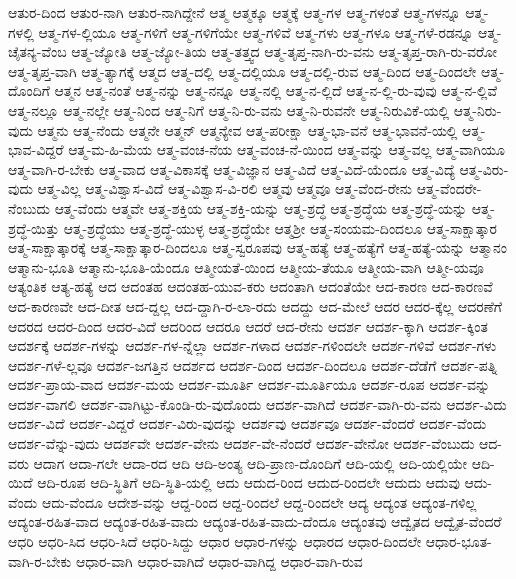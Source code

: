 {ಆತುರ-ದಿಂದ
ಆತುರ-ನಾಗಿ
ಆತುರ-ನಾಗಿದ್ದೇನೆ
ಆತ್ಮ
ಆತ್ಮಕ್ಕೂ
ಆತ್ಮಕ್ಕೆ
ಆತ್ಮ-ಗಳ
ಆತ್ಮ-ಗಳಂತೆ
ಆತ್ಮ-ಗಳನ್ನೂ
ಆತ್ಮ-ಗಳಲ್ಲಿ
ಆತ್ಮ-ಗಳ-ಲ್ಲಿಯೂ
ಆತ್ಮ-ಗಳಿಗೆ
ಆತ್ಮ-ಗಳಿಗೆಯೇ
ಆತ್ಮ-ಗಳಿವೆ
ಆತ್ಮ-ಗಳು
ಆತ್ಮ-ಗಳೂ
ಆತ್ಮ-ಗಳೆ-ರಡನ್ನೂ
ಆತ್ಮ-ಚೈತನ್ಯ-ವೆಂಬ
ಆತ್ಮ-ಜ್ಯೋತಿ
ಆತ್ಮ-ಜ್ಯೋ-ತಿಯ
ಆತ್ಮ-ತತ್ತ್ವದ
ಆತ್ಮ-ತೃಪ್ತ-ನಾಗಿ-ರು-ವನು
ಆತ್ಮ-ತೃಪ್ತ-ರಾಗಿ-ರು-ವರೋ
ಆತ್ಮ-ತೃಪ್ತ-ವಾಗಿ
ಆತ್ಮ-ತ್ಯಾಗಕ್ಕೆ
ಆತ್ಮದ
ಆತ್ಮ-ದಲ್ಲಿ
ಆತ್ಮ-ದಲ್ಲಿಯೂ
ಆತ್ಮ-ದಲ್ಲಿ-ರುವ
ಆತ್ಮ-ದಿಂದ
ಆತ್ಮ-ದಿಂದಲೇ
ಆತ್ಮ-ದೊಂದಿಗೆ
ಆತ್ಮನ
ಆತ್ಮ-ನಂತೆ
ಆತ್ಮ-ನನ್ನು
ಆತ್ಮ-ನನ್ನೂ
ಆತ್ಮ-ನಲ್ಲಿ
ಆತ್ಮ-ನ-ಲ್ಲಿದೆ
ಆತ್ಮ-ನ-ಲ್ಲಿ-ರು-ವುವು
ಆತ್ಮ-ನ-ಲ್ಲಿವೆ
ಆತ್ಮ-ನಲ್ಲೂ
ಆತ್ಮ-ನಲ್ಲೇ
ಆತ್ಮ-ನಿಂದ
ಆತ್ಮ-ನಿಗೆ
ಆತ್ಮ-ನಿ-ರು-ವನು
ಆತ್ಮ-ನಿ-ರುವನೇ
ಆತ್ಮ-ನಿರುವಿಕೆ-ಯಲ್ಲಿ
ಆತ್ಮ-ನಿರು-ವುದು
ಆತ್ಮನು
ಆತ್ಮ-ನೆಂದು
ಆತ್ಮನೇ
ಆತ್ಮನ್
ಆತ್ಮನ್ಯೇವ
ಆತ್ಮ-ಪರೀಕ್ಷಾ
ಆತ್ಮ-ಭಾ-ವನೆ
ಆತ್ಮ-ಭಾವನೆ-ಯಲ್ಲಿ
ಆತ್ಮ-ಭಾವ-ವಿದ್ದರೆ
ಆತ್ಮ-ಮ-ಹಿ-ಮೆಯ
ಆತ್ಮ-ವಂಚ-ನೆಯ
ಆತ್ಮ-ವಂಚ-ನೆ-ಯಿಂದ
ಆತ್ಮ-ವನ್ನು
ಆತ್ಮ-ವಲ್ಲ
ಆತ್ಮ-ವಾಗಿಯೂ
ಆತ್ಮ-ವಾಗಿ-ರ-ಬೇಕು
ಆತ್ಮ-ವಾದ
ಆತ್ಮ-ವಿಕಾಸಕ್ಕೆ
ಆತ್ಮ-ವಿಜ್ಞಾನ
ಆತ್ಮ-ವಿದೆ
ಆತ್ಮ-ವಿದೆ-ಯೆಂದೂ
ಆತ್ಮ-ವಿದ್ಯೆ
ಆತ್ಮ-ವಿರು-ವುದು
ಆತ್ಮ-ವಿಲ್ಲ
ಆತ್ಮ-ವಿಶ್ವಾಸ-ವಿದೆ
ಆತ್ಮ-ವಿಶ್ವಾಸ-ವಿ-ರಲಿ
ಆತ್ಮವು
ಆತ್ಮವೂ
ಆತ್ಮ-ವೆಂದ-ರೇನು
ಆತ್ಮ-ವೆಂದರೇ-ನೆಂಬುದು
ಆತ್ಮ-ವೆಂದು
ಆತ್ಮವೇ
ಆತ್ಮ-ಶಕ್ತಿಯ
ಆತ್ಮ-ಶಕ್ತಿ-ಯನ್ನು
ಆತ್ಮ-ಶ್ರದ್ಧೆ
ಆತ್ಮ-ಶ್ರದ್ಧೆಯ
ಆತ್ಮ-ಶ್ರದ್ಧೆ-ಯನ್ನು
ಆತ್ಮ-ಶ್ರದ್ಧೆ-ಯಿತ್ತು
ಆತ್ಮ-ಶ್ರದ್ಧೆಯು
ಆತ್ಮ-ಶ್ರದ್ಧೆ-ಯುಳ್ಳ
ಆತ್ಮ-ಶ್ರದ್ಧೆಯೇ
ಆತ್ಮಶ್ರೀ
ಆತ್ಮ-ಸಂಯಮ-ದಿಂದಲೂ
ಆತ್ಮ-ಸಾಕ್ಷಾತ್ಕಾರ
ಆತ್ಮ-ಸಾಕ್ಷಾತ್ಕಾರಕ್ಕೆ
ಆತ್ಮ-ಸಾಕ್ಷಾತ್ಕಾರ-ದಿಂದಲೂ
ಆತ್ಮ-ಸ್ವರೂಪವು
ಆತ್ಮ-ಹತ್ಯೆ
ಆತ್ಮ-ಹತ್ಯೆಗೆ
ಆತ್ಮ-ಹತ್ಯೆ-ಯನ್ನು
ಆತ್ಮಾನಂ
ಆತ್ಮಾನು-ಭೂತಿ
ಆತ್ಮಾನು-ಭೂತಿ-ಯೆಂದೂ
ಆತ್ಮೀಯತೆ-ಯಿಂದ
ಆತ್ಮೀಯ-ತೆಯೂ
ಆತ್ಮೀಯ-ವಾಗಿ
ಆತ್ಮೀ-ಯವೂ
ಆತ್ಯಂತಿಕ
ಆತ್ಯ-ಹತ್ಯೆ
ಆದ
ಆದಂತಹ
ಆದಂತಹ-ಯುವ-ಕರು
ಆದಂತಾಗಿ
ಆದಂತೆಯೇ
ಆದ-ಕಾರಣ
ಆದ-ಕಾರಣವೆ
ಆದ-ಕಾರಣವೇ
ಆದ-ದೀತ
ಆದ-ದ್ದಲ್ಲ
ಆದ-ದ್ದಾಗಿ-ರ-ಲಾ-ರದು
ಆದದ್ದು
ಆದ-ಮೇಲೆ
ಆದರ
ಆದರ-ಕ್ಕೆಲ್ಲ
ಆದರಣೆಗೆ
ಆದರದ
ಆದರ-ದಿಂದ
ಆದರ-ವಿದೆ
ಆದರಿಂದ
ಆದರೂ
ಆದರೆ
ಆದ-ರೇನು
ಆದರ್ಶ
ಆದರ್ಶ-ಕ್ಕಾಗಿ
ಆದರ್ಶ-ಕ್ಕಿಂತ
ಆದರ್ಶಕ್ಕೆ
ಆದರ್ಶ-ಗಳನ್ನು
ಆದರ್ಶ-ಗಳ-ನ್ನೆಲ್ಲಾ
ಆದರ್ಶ-ಗಳಾದ
ಆದರ್ಶ-ಗಳಿಂದಲೇ
ಆದರ್ಶ-ಗಳಿವೆ
ಆದರ್ಶ-ಗಳು
ಆದರ್ಶ-ಗಳೆ-ಲ್ಲವೂ
ಆದರ್ಶ-ಜಗತ್ತಿನ
ಆದರ್ಶದ
ಆದರ್ಶ-ದಿಂದ
ಆದರ್ಶ-ದಿಂದಲೂ
ಆದರ್ಶ-ದೆಡೆಗೆ
ಆದರ್ಶ-ಪತ್ನಿ
ಆದರ್ಶ-ಪ್ರಾಯ-ವಾದ
ಆದರ್ಶ-ಮಯ
ಆದರ್ಶ-ಮೂರ್ತಿ
ಆದರ್ಶ-ಮೂರ್ತಿಯೂ
ಆದರ್ಶ-ರೂಪ
ಆದರ್ಶ-ವನ್ನು
ಆದರ್ಶ-ವಾಗಲಿ
ಆದರ್ಶ-ವಾಗಿಟ್ಟು-ಕೊಂಡಿ-ರು-ವುದೊಂದು
ಆದರ್ಶ-ವಾಗಿದೆ
ಆದರ್ಶ-ವಾಗಿ-ರು-ವನು
ಆದರ್ಶ-ವಿದು
ಆದರ್ಶ-ವಿದೆ
ಆದರ್ಶ-ವಿದ್ದರೆ
ಆದರ್ಶ-ವಿರು-ವುದನ್ನು
ಆದರ್ಶವು
ಆದರ್ಶವೂ
ಆದರ್ಶ-ವೆಂದರೆ
ಆದರ್ಶ-ವೆಂದು
ಆದರ್ಶ-ವೆನ್ನು-ವುದು
ಆದರ್ಶವೇ
ಆದರ್ಶ-ವೇನು
ಆದರ್ಶ-ವೇ-ನೆಂದರೆ
ಆದರ್ಶ-ವೇನೋ
ಆದರ್ಶ-ವೆಂಬುದು
ಆದ-ವರು
ಆದಾಗ
ಆದಾ-ಗಲೇ
ಆದಾ-ರದ
ಆದಿ
ಆದಿ-ಅಂತ್ಯ
ಆದಿ-ಪ್ರಾಣ-ದೊಂದಿಗೆ
ಆದಿ-ಯಲ್ಲಿ
ಆದಿ-ಯಲ್ಲಿಯೇ
ಆದಿ-ಯಿದೆ
ಆದಿ-ರೂಪ
ಆದಿ-ಸ್ಥಿತಿಗೆ
ಆದಿ-ಸ್ಥಿತಿ-ಯಲ್ಲಿ
ಆದು
ಆದುದ-ರಿಂದ
ಆದುದ-ರಿಂದಲೇ
ಆದುದು
ಆದುವು
ಆದು-ವೆಂದು
ಆದು-ವೆಂದೂ
ಆದೇಶ-ವನ್ನು
ಆದ್ದ-ರಿಂದ
ಆದ್ದ-ರಿಂದಲೆ
ಆದ್ದ-ರಿಂದಲೇ
ಆದ್ಯ
ಆದ್ಯಂತ
ಆದ್ಯಂತ-ಗಳಿಲ್ಲ
ಆದ್ಯಂತ-ರಹಿತ-ವಾದ
ಆದ್ಯಂತ-ರಹಿತ-ವಾದು
ಆದ್ಯಂತ-ರಹಿತ-ವಾದು-ದೆಂದೂ
ಆದ್ಯಂತವು
ಆದ್ವೈತದ
ಆದ್ವೈತ-ವೆಂದರೆ
ಆಧರಿ
ಆಧರಿ-ಸಿದ
ಆಧರಿ-ಸಿದೆ
ಆಧರಿ-ಸಿದ್ದು
ಆಧಾರ
ಆಧಾರ-ಗಳನ್ನು
ಆಧಾರದ
ಆಧಾರ-ದಿಂದಲೇ
ಆಧಾರ-ಭೂತ-ವಾಗಿ-ರ-ಬೇಕು
ಆಧಾರ-ವಾಗಿ
ಆಧಾರ-ವಾಗಿದೆ
ಆಧಾರ-ವಾಗಿದ್ದ
ಆಧಾರ-ವಾಗಿ-ರುವ
}
